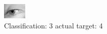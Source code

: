 \begin{figure}[h!]
\begin{center}
\includegraphics[width=0.60\columnwidth]{figures/ID2922_class_3_target_4.png}
\end{center}
\caption{ Classification: 3 actual target: 4}
\label{fig:ID2922_class_3_target_4}
\end{figure}
